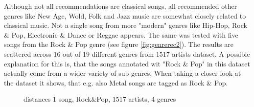 \noindent Although not all recommendations are classical songs, all recommended other genres like New Age, Wold, Folk and Jazz music are somewhat closely related to classical music.  Not a single song from more "modern" genres like Hip-Hop, Rock \& Pop, Electronic \& Dance or Reggae appears.
\noindent The same was tested with five songs from the Rock \& Pop genre (see figure \ref{fig:genrerec2}). The results are scattered across 16 out of 19 different genres from 1517 artists dataset. A possible explanation for this is, that the songs annotated wit "Rock \& Pop" in this dataset actually come from a wider variety of sub-genres. When taking a closer look at the dataset it shows, that e.g. also Metal songs are tagged as Rock \& Pop.\\
\begin{figure}[htbp]
	\centering
	\caption{distances 1 song, Rock\&Pop, 1517 artists, 4 genres}
	\label{fig:corr5}
\end{figure}
\FloatBarrier

